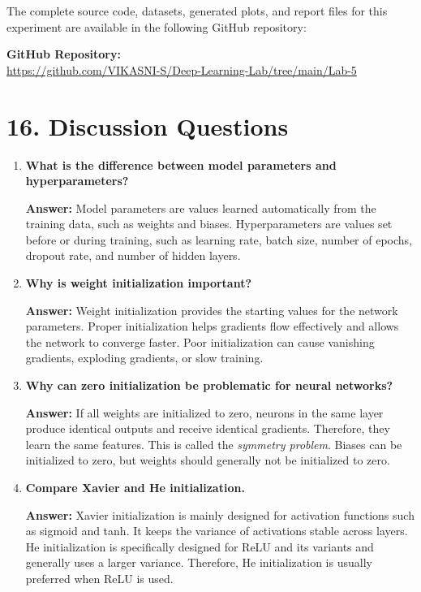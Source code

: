 \documentclass[10pt]{article}
\begin{document}
The complete source code, datasets, generated plots, and report files for this experiment are available in the following GitHub repository:



\noindent\textbf{GitHub Repository:} \\
\url{https://github.com/VIKASNI-S/Deep-Learning-Lab/tree/main/Lab-5}\\

\section*{16. Discussion Questions}

\begin{enumerate}

\item \textbf{What is the difference between model parameters and hyperparameters?}

\textbf{Answer:} Model parameters are values learned automatically from the training data, such as weights and biases. Hyperparameters are values set before or during training, such as learning rate, batch size, number of epochs, dropout rate, and number of hidden layers.

\item \textbf{Why is weight initialization important?}

\textbf{Answer:} Weight initialization provides the starting values for the network parameters. Proper initialization helps gradients flow effectively and allows the network to converge faster. Poor initialization can cause vanishing gradients, exploding gradients, or slow training.

\item \textbf{Why can zero initialization be problematic for neural networks?}

\textbf{Answer:} If all weights are initialized to zero, neurons in the same layer produce identical outputs and receive identical gradients. Therefore, they learn the same features. This is called the \textit{symmetry problem}. Biases can be initialized to zero, but weights should generally not be initialized to zero.

\item \textbf{Compare Xavier and He initialization.}

\textbf{Answer:} Xavier initialization is mainly designed for activation functions such as sigmoid and tanh. It keeps the variance of activations stable across layers. He initialization is specifically designed for ReLU and its variants and generally uses a larger variance. Therefore, He initialization is usually preferred when ReLU is used.


\end{enumerate}
\end{document}
